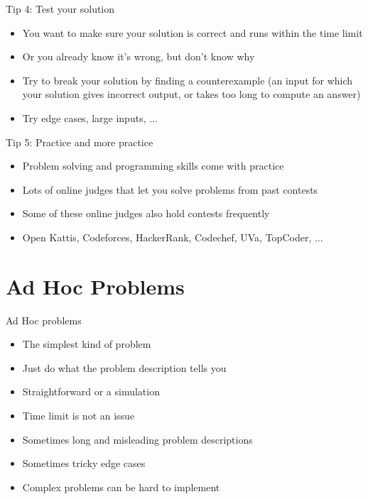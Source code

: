 \documentclass[10pt]{beamer}
\newcommand{\bi}{\begin{itemize}}
\newcommand{\ei}{\end{itemize}}
\begin{document}
\begin{frame}{Tip 4: Test your solution}
    \bi
        \item You want to make sure your solution is correct and runs within the time limit
        \item Or you already know it's wrong, but don't know why
        \vspace{10pt}
        \item Try to break your solution by finding a counterexample (an input for which your solution gives incorrect output, or takes too long to compute an answer)
        \item Try edge cases, large inputs, ...
    \ei
\end{frame}

\begin{frame}{Tip 5: Practice and more practice}
    \bi
        \item Problem solving and programming skills come with practice
        \item Lots of online judges that let you solve problems from past contests
        \item Some of these online judges also hold contests frequently
        \item Open Kattis, Codeforces, HackerRank, Codechef, UVa, TopCoder, ...
    \ei
\end{frame}


\section{Ad Hoc Problems}

\begin{frame}{Ad Hoc problems}
    \bi
        \item The simplest kind of problem
        \item Just do what the problem description tells you
        \item Straightforward or a simulation
        \item Time limit is not an issue
        \item Sometimes long and misleading problem descriptions
        \item Sometimes tricky edge cases
        \item Complex problems can be hard to implement
    \ei
\end{frame}
\end{document}
